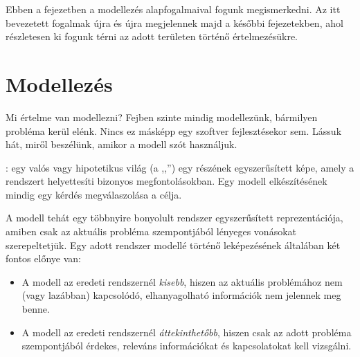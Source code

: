 
\graphicspath{ {./modellezes-es-metamodellezes/figures/} }

Ebben a fejezetben a modellezés alapfogalmaival fogunk megismerkedni. Az itt bevezetett fogalmak újra és újra megjelennek majd a későbbi fejezetekben, ahol részletesen ki fogunk térni az adott területen történő értelmezésükre.


\section{Modellezés}

Mi értelme van modellezni? Fejben szinte mindig modellezünk, bármilyen probléma kerül elénk. Nincs ez másképp egy szoftver fejlesztésekor sem. Lássuk hát, miről beszélünk, amikor a modell szót használjuk.

\begin{definicio}
	: egy valós vagy hipotetikus világ (a ,,'') egy részének egyszerűsített képe, amely a rendszert helyettesíti bizonyos megfontolásokban. Egy modell elkészítésének mindig egy kérdés megválaszolása a célja.
\end{definicio}

A modell tehát egy többnyire bonyolult rendszer egyszerűsített reprezentációja, amiben csak az aktuális probléma szempontjából lényeges vonásokat szerepeltetjük.
Egy adott rendszer modellé történő leképezésének általában két fontos előnye van: %

\begin{itemize}
	\item A modell az eredeti rendszernél \emph{kisebb}, hiszen az aktuális problémához nem (vagy lazábban) kapcsolódó, elhanyagolható információk nem jelennek meg benne.
	\item A modell az eredeti rendszernél \emph{áttekinthetőbb}, hiszen csak az adott probléma szempontjából érdekes, releváns információkat és kapcsolatokat kell vizsgálni.
\end{itemize}

